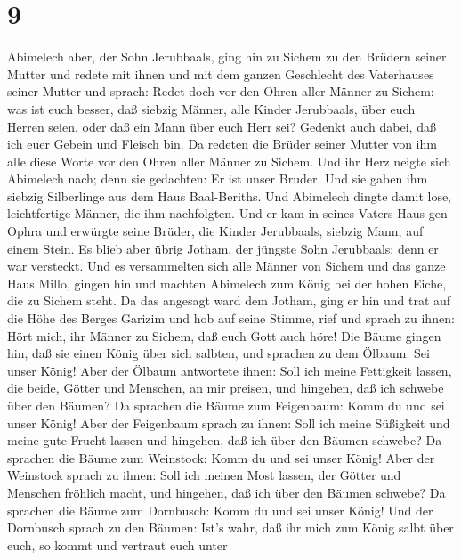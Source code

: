 \hypertarget{section-8}{%
\section{9}\label{section-8}}

 Abimelech aber, der Sohn Jerubbaals, ging hin zu Sichem zu
den Brüdern seiner Mutter und redete mit ihnen und mit dem ganzen
Geschlecht des Vaterhauses seiner Mutter und sprach:  Redet
doch vor den Ohren aller Männer zu Sichem: was ist euch besser, daß
siebzig Männer, alle Kinder Jerubbaals, über euch Herren seien, oder daß
ein Mann über euch Herr sei? Gedenkt auch dabei, daß ich euer Gebein und
Fleisch bin.  Da redeten die Brüder seiner Mutter von ihm
alle diese Worte vor den Ohren aller Männer zu Sichem. Und ihr Herz
neigte sich Abimelech nach; denn sie gedachten: Er ist unser Bruder.
 Und sie gaben ihm siebzig Silberlinge aus dem Haus
Baal-Beriths. Und Abimelech dingte damit lose, leichtfertige Männer, die
ihm nachfolgten.  Und er kam in seines Vaters Haus gen Ophra
und erwürgte seine Brüder, die Kinder Jerubbaals, siebzig Mann, auf
einem Stein. Es blieb aber übrig Jotham, der jüngste Sohn Jerubbaals;
denn er war versteckt.  Und es versammelten sich alle Männer
von Sichem und das ganze Haus Millo, gingen hin und machten Abimelech
zum König bei der hohen Eiche, die zu Sichem steht.  Da das
angesagt ward dem Jotham, ging er hin und trat auf die Höhe des Berges
Garizim und hob auf seine Stimme, rief und sprach zu ihnen: Hört mich,
ihr Männer zu Sichem, daß euch Gott auch höre!  Die Bäume
gingen hin, daß sie einen König über sich salbten, und sprachen zu dem
Ölbaum: Sei unser König!  Aber der Ölbaum antwortete ihnen:
Soll ich meine Fettigkeit lassen, die beide, Götter und Menschen, an mir
preisen, und hingehen, daß ich schwebe über den Bäumen?  Da
sprachen die Bäume zum Feigenbaum: Komm du und sei unser König!
 Aber der Feigenbaum sprach zu ihnen: Soll ich meine
Süßigkeit und meine gute Frucht lassen und hingehen, daß ich über den
Bäumen schwebe?  Da sprachen die Bäume zum Weinstock: Komm
du und sei unser König!  Aber der Weinstock sprach zu
ihnen: Soll ich meinen Most lassen, der Götter und Menschen fröhlich
macht, und hingehen, daß ich über den Bäumen schwebe?  Da
sprachen die Bäume zum Dornbusch: Komm du und sei unser König!
 Und der Dornbusch sprach zu den Bäumen: Ist's wahr, daß
ihr mich zum König salbt über euch, so kommt und vertraut euch unter
